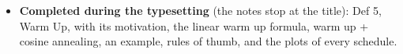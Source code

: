 \begin{itemize}
  \item \textbf{Completed during the typesetting} (the notes stop at the title): Def 5, Warm Up, with its motivation, the linear warm up formula, warm up + cosine annealing, an example, rules of thumb, and the plots of every schedule.
\end{itemize}
